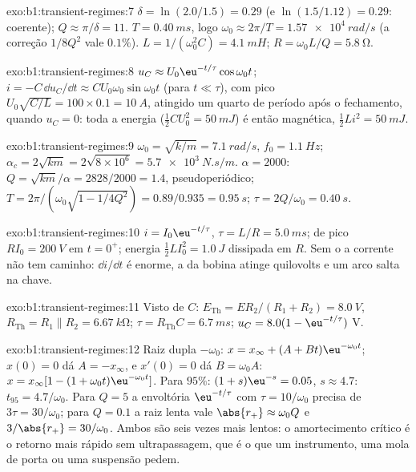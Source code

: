\begin{solution}{exo:b1:transient-regimes:7}
$\delta = \ln(2.0/1.5) = 0.29$ (e $\ln(1.5/1.12) = 0.29$: coerente);
$Q \approx \pi/\delta = 11$. $T = \qty{0.40}{ms}$, logo $\omega_0 \approx
2\pi/T = \qty{1.57e4}{rad/s}$ (a correção $1/8Q^2$ vale $0.1\%$).
$L = 1/(\omega_0^2 C) = \qty{4.1}{mH}$; $R = \omega_0 L/Q = \qty{5.8}{\ohm}$.
\end{solution}

\begin{solution}{exo:b1:transient-regimes:8}
$u_C \approx U_0\eu^{-t/\tau}\cos\omega_0 t$; $i = -C\,\dd u_C/\dd t
\approx CU_0\omega_0\sin\omega_0 t$ (para $t \ll \tau$), com pico $U_0\sqrt{C/L}
= 100 \times 0.1 = \qty{10}{A}$, atingido um quarto de período após o fechamento,
quando $u_C = 0$: toda a energia ($\tfrac12 CU_0^2 = \qty{50}{mJ}$) é então
magnética, $\tfrac12 Li^2 = \qty{50}{mJ}$.
\end{solution}

\begin{solution}{exo:b1:transient-regimes:9}
$\omega_0 = \sqrt{k/m} = \qty{7.1}{rad/s}$, $f_0 = \qty{1.1}{Hz}$;
$\alpha_c = 2\sqrt{km} = 2\sqrt{8\times10^6} = \qty{5.7e3}{N.s/m}$.
$\alpha = 2000$: $Q = \sqrt{km}/\alpha = 2828/2000 = 1.4$, pseudoperiódico;
$T = 2\pi/(\omega_0\sqrt{1 - 1/4Q^2}) = 0.89/0.935 = \qty{0.95}{s}$;
$\tau = 2Q/\omega_0 = \qty{0.40}{s}$.
\end{solution}

\begin{solution}{exo:b1:transient-regimes:10}
$i = I_0\eu^{-t/\tau}$, $\tau = L/R = \qty{5.0}{ms}$;  de pico
$RI_0 = \qty{200}{V}$ em $t = 0^+$; energia $\tfrac12 LI_0^2 = \qty{1.0}{J}$
dissipada em $R$. Sem o  a corrente não tem caminho:
$\dd i/\dd t$ é enorme, a  da bobina atinge quilovolts e um arco
salta na chave.
\end{solution}

\begin{solution}{exo:b1:transient-regimes:11}
Visto de $C$: $E_{\mathrm{Th}} = ER_2/(R_1 + R_2) = \qty{8.0}{V}$,
$R_{\mathrm{Th}} = R_1 \parallel R_2 = \qty{6.67}{k\ohm}$; $\tau =
R_{\mathrm{Th}}C = \qty{6.7}{ms}$; $u_C = 8.0(1 - \eu^{-t/\tau})$ V.
\end{solution}

\begin{solution}{exo:b1:transient-regimes:12}
Raiz dupla $-\omega_0$: $x = x_\infty + (A + Bt)\eu^{-\omega_0 t}$;
$x(0) = 0$ dá $A = -x_\infty$, e $x'(0) = 0$ dá $B = \omega_0 A$:
$x = x_\infty[1 - (1 + \omega_0 t)\eu^{-\omega_0 t}]$. Para $95\%$:
$(1 + s)\eu^{-s} = 0.05$, $s \approx 4.7$: $t_{95} = 4.7/\omega_0$. Para
$Q = 5$ a envoltória $\eu^{-t/\tau}$ com $\tau = 10/\omega_0$ precisa de
$3\tau = 30/\omega_0$; para $Q = 0.1$ a raiz lenta vale $\abs{r_+} \approx
\omega_0 Q$ e $3/\abs{r_+} = 30/\omega_0$. Ambos são seis vezes mais lentos:
o amortecimento crítico é o retorno mais rápido sem ultrapassagem, que é o que
um instrumento, uma mola de porta ou uma suspensão pedem.
\end{solution}

